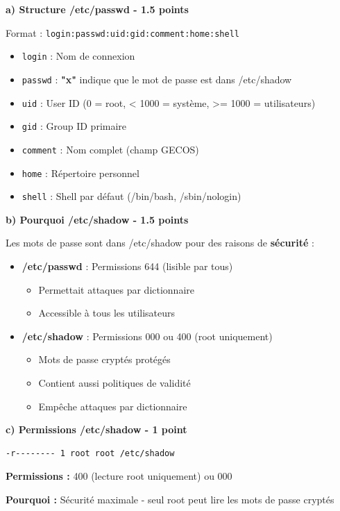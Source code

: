 \documentclass[12pt,a4paper]{article}
\begin{document}
\begin{answerbox}
\textbf{a) Structure /etc/passwd - 1.5 points}

Format : \texttt{login:passwd:uid:gid:comment:home:shell}

\begin{itemize}
    \item \texttt{login} : Nom de connexion
    \item \texttt{passwd} : \textbf{"x"} indique que le mot de passe est dans /etc/shadow
    \item \texttt{uid} : User ID (0 = root, < 1000 = système, >= 1000 = utilisateurs)
    \item \texttt{gid} : Group ID primaire
    \item \texttt{comment} : Nom complet (champ GECOS)
    \item \texttt{home} : Répertoire personnel
    \item \texttt{shell} : Shell par défaut (/bin/bash, /sbin/nologin)
\end{itemize}

\textbf{b) Pourquoi /etc/shadow - 1.5 points}

Les mots de passe sont dans /etc/shadow pour des raisons de \textbf{sécurité} :

\begin{itemize}
    \item \textbf{/etc/passwd} : Permissions 644 (lisible par tous)
    \begin{itemize}
        \item Permettait attaques par dictionnaire
        \item Accessible à tous les utilisateurs
    \end{itemize}
    \item \textbf{/etc/shadow} : Permissions 000 ou 400 (root uniquement)
    \begin{itemize}
        \item Mots de passe cryptés protégés
        \item Contient aussi politiques de validité
        \item Empêche attaques par dictionnaire
    \end{itemize}
\end{itemize}

\textbf{c) Permissions /etc/shadow - 1 point}

\begin{lstlisting}
-r-------- 1 root root /etc/shadow
\end{lstlisting}

\textbf{Permissions :} 400 (lecture root uniquement) ou 000

\textbf{Pourquoi :} Sécurité maximale - seul root peut lire les mots de passe cryptés
\end{answerbox}
\end{document}
